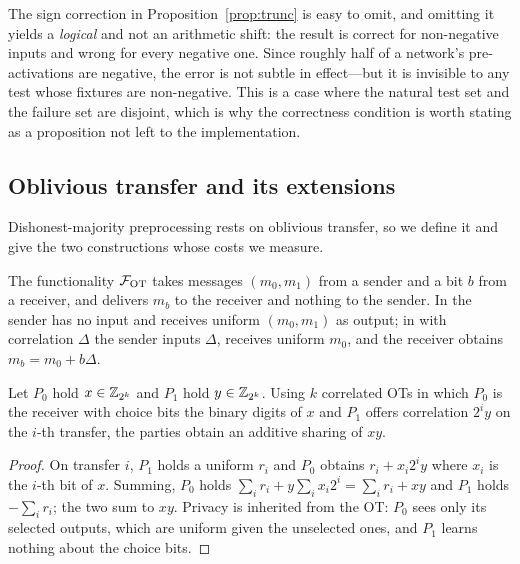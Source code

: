 \begin{remark}
\label{rem:trunc-sign}
The sign correction in Proposition~\ref{prop:trunc} is easy to omit, and omitting
it yields a \emph{logical} and not an arithmetic shift: the result is correct for
non-negative inputs and wrong for every negative one. Since roughly half of a
network's pre-activations are negative, the error is not subtle in effect---but it
is invisible to any test whose fixtures are non-negative. This is a case where the
natural test set and the failure set are disjoint, which is why the correctness
condition is worth stating as a proposition not left to the
implementation.
\end{remark}

\subsection{Oblivious transfer and its extensions}
\label{sec:found:ot}

Dishonest-majority preprocessing rests on oblivious transfer, so we define it and
give the two constructions whose costs we measure.

\begin{definition}
\label{def:ot}
The functionality $\mathcal{F}_{\mathrm{OT}}$ takes messages $(m_0,m_1)$ from a sender
and a bit $b$ from a receiver, and delivers $m_b$ to the receiver and nothing to
the sender. In  the sender has no input and receives uniform
$(m_0,m_1)$ as output; in  with correlation $\Delta$ the sender
inputs $\Delta$, receives uniform $m_0$, and the receiver obtains
$m_b = m_0 + b\Delta$.
\end{definition}

\begin{proposition}[Gilboa]
\label{prop:gilboa}
Let $P_0$ hold $x \in \mathbb{Z}_{2^k}$ and $P_1$ hold $y \in \mathbb{Z}_{2^k}$. Using $k$
correlated OTs in which $P_0$ is the receiver with choice bits the binary digits
of $x$ and $P_1$ offers correlation $2^{i}y$ on the $i$-th transfer, the parties
obtain an additive sharing of $xy$.
\end{proposition}

\begin{proof}
On transfer $i$, $P_1$ holds a uniform $r_i$ and $P_0$ obtains
$r_i + x_i 2^{i} y$ where $x_i$ is the $i$-th bit of $x$. Summing,
$P_0$ holds $\sum_i r_i + y\sum_i x_i 2^i = \sum_i r_i + xy$ and $P_1$ holds
$-\sum_i r_i$; the two sum to $xy$. Privacy is inherited from the OT: $P_0$ sees
only its selected outputs, which are uniform given the unselected ones, and $P_1$
learns nothing about the choice bits.
\end{proof}

